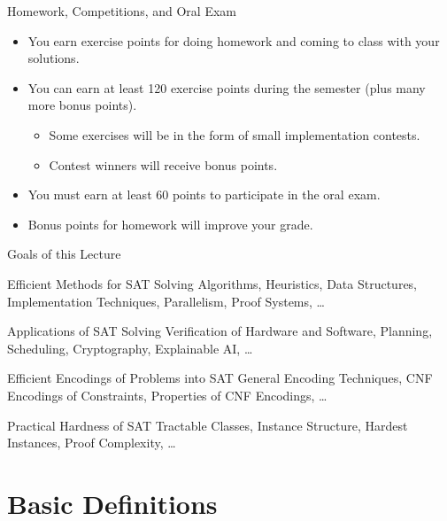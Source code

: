 \documentclass[t]{sdqbeamer}
\begin{document}
\begin{frame}{Homework, Competitions, and Oral Exam}
\begin{itemize}\setlength{\itemsep}{1em}
	\item You earn exercise points for doing homework and coming to class with your solutions.
	\item You can earn at least 120 exercise points during the semester (plus many more bonus points).
	\begin{itemize}
		\item Some exercises will be in the form of small implementation contests.
		\item Contest winners will receive bonus points.
	\end{itemize}
	\item You must earn at least 60 points to participate in the oral exam.
	\item Bonus points for homework will improve your grade.
\end{itemize}
\end{frame}

\begin{frame}{Goals of this Lecture}
\begin{block}{Efficient Methods for SAT Solving}
	Algorithms, Heuristics, Data Structures, Implementation Techniques, Parallelism, Proof Systems, \dots
\end{block}
\pause
\begin{block}{Applications of SAT Solving}
	Verification of Hardware and Software, Planning, Scheduling, Cryptography, Explainable AI, \dots
\end{block}
\pause
\begin{block}{Efficient Encodings of Problems into SAT}
	General Encoding Techniques, CNF Encodings of Constraints, Properties of CNF Encodings, \dots
\end{block}
\pause
\begin{block}{Practical Hardness of SAT}
	Tractable Classes, Instance Structure, Hardest Instances, Proof Complexity, \dots
\end{block}
\end{frame}


\section{Basic Definitions}
\end{document}
